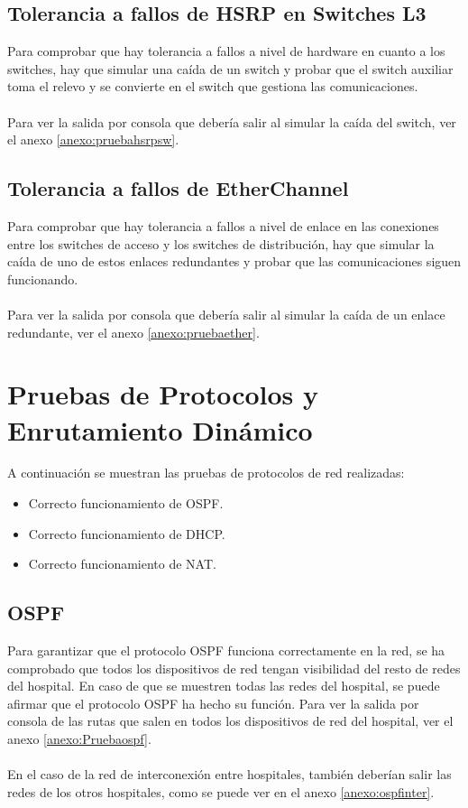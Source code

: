 \subsection{Tolerancia a fallos de HSRP en Switches L3}
Para comprobar que hay tolerancia a fallos a nivel de hardware en cuanto a los switches, hay que simular una caída de un switch y probar que el switch auxiliar toma el relevo y se convierte en 
el switch que gestiona las comunicaciones.
\\ \\ 
Para ver la salida por consola que debería salir al simular la caída del switch, ver el anexo \ref{anexo:pruebahsrpsw}.

\subsection{Tolerancia a fallos de EtherChannel}
Para comprobar que hay tolerancia a fallos a nivel de enlace en las conexiones entre los switches de acceso y los switches de distribución, hay que simular la caída de uno de estos enlaces redundantes y probar que las comunicaciones siguen funcionando.
\\ \\ 
Para ver la salida por consola que debería salir al simular la caída de un enlace redundante, ver el anexo \ref{anexo:pruebaether}.

\section{Pruebas de Protocolos y Enrutamiento Dinámico}
A continuación se muestran las pruebas de protocolos de red realizadas:
\begin{itemize}
    \item Correcto funcionamiento de OSPF.
    \item Correcto funcionamiento de DHCP.
    \item Correcto funcionamiento de NAT.
\end{itemize}
\subsection{OSPF}
Para garantizar que el protocolo OSPF funciona correctamente en la red, se ha comprobado que todos los dispositivos de red tengan visibilidad del resto de redes del hospital. 
En caso de que se muestren todas las redes del hospital, se puede afirmar que el protocolo OSPF ha hecho su función. Para ver la salida por consola de las rutas que salen en todos 
los dispositivos de red del hospital, ver el anexo \ref{anexo:Pruebaospf}.
\\ \\ 
En el caso de la red de interconexión entre hospitales, también deberían salir las redes de los otros hospitales, como se puede ver en el anexo \ref{anexo:ospfinter}.

